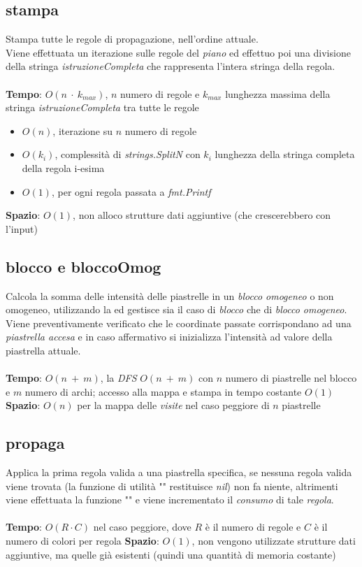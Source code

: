 \documentclass{article}
\begin{document}
\subsection{stampa}
Stampa tutte le regole di propagazione, nell'ordine attuale.\\
Viene effettuata un iterazione sulle regole del \textit{piano} ed effettuo poi una divisione della stringa \textit{istruzioneCompleta} che rappresenta l'intera stringa della regola.\\ \\
\textbf{Tempo}: \(O(n\ \cdot\ k_{max})\), \(n\) numero di regole e \(k_{max}\) lunghezza massima della stringa \textit{istruzioneCompleta} tra tutte le regole\\
\begin{itemize}
  \item \(O(n)\), iterazione su \(n\) numero di regole
  \item \(O(k_i)\), complessità di \textit{strings.SplitN} con \(k_i\) lunghezza della stringa completa della regola i-esima
  \item \(O(1)\), per ogni regola passata a \textit{fmt.Printf}
\end{itemize}
\textbf{Spazio}: \(O(1)\), non alloco strutture dati aggiuntive (che crescerebbero con l'input)

\subsection{blocco e bloccoOmog}\label{sec:block}
Calcola la somma delle intensità delle piastrelle in un \textit{blocco omogeneo} o non omogeneo, utilizzando la  ed gestisce sia il caso di \textit{blocco} che di \textit{blocco omogeneo}.\\
Viene preventivamente verificato che le coordinate passate corrispondano ad una \textit{piastrella accesa} e in caso affermativo si inizializza l'intensità ad valore della piastrella attuale.\\ \\
\textbf{Tempo}: \(O(n\ +\ m)\), la \textit{DFS} \(O(n\ +\ m)\) con \(n\) numero di piastrelle nel blocco e  \(m\) numero di archi; accesso alla mappa e stampa in tempo costante \(O(1)\)\\
\textbf{Spazio}: \(O(n)\) per la mappa delle \textit{visite} nel caso peggiore di \(n\) piastrelle

\subsection{propaga}\label{sec:prop}
Applica la prima regola valida a una piastrella specifica, se nessuna regola valida viene trovata (la funzione di utilità "" restituisce \textit{nil}) non fa niente, altrimenti viene effettuata la funzione "" e viene incrementato il \textit{consumo} di tale \textit{regola}.\\ \\
\textbf{Tempo}: \(O(R \cdot C)\) nel caso peggiore, dove \(R\) è il numero di regole e \(C\) è il numero di colori per regola
\textbf{Spazio}: \(O(1)\), non vengono utilizzate strutture dati aggiuntive, ma quelle già esistenti (quindi una quantità di memoria costante)
\end{document}
